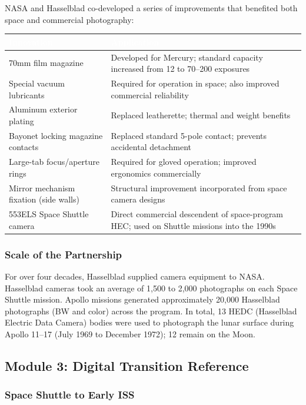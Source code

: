 \documentclass[11pt,letterpaper]{article}
\newcommand{\tableheader}[1]{\textbf{\sffamily\textcolor{white}{#1}}}
\begin{document}
NASA and Hasselblad co-developed a series of improvements that benefited both space and commercial photography:

\begin{center}
\begin{tabularx}{\textwidth}{L{5cm}X}
\toprule
{}
\tableheader{Innovation} & \tableheader{Application} \\
\midrule
70mm film magazine & Developed for Mercury; standard capacity increased from 12 to 70--200 exposures \\
Special vacuum lubricants & Required for operation in space; also improved commercial reliability \\
Aluminum exterior plating & Replaced leatherette; thermal and weight benefits \\
Bayonet locking magazine contacts & Replaced standard 5-pole contact; prevents accidental detachment \\
Large-tab focus/aperture rings & Required for gloved operation; improved ergonomics commercially \\
Mirror mechanism fixation (side walls) & Structural improvement incorporated from space camera designs \\
553ELS Space Shuttle camera & Direct commercial descendent of space-program HEC; used on Shuttle missions into the 1990s \\
\bottomrule
\end{tabularx}
\end{center}

\subsubsection{Scale of the Partnership}

For over four decades, Hasselblad supplied camera equipment to NASA. Hasselblad cameras took an average of 1,500 to 2,000 photographs on each Space Shuttle mission. Apollo missions generated approximately 20,000 Hasselblad photographs (BW and color) across the program. In total, 13 HEDC (Hasselblad Electric Data Camera) bodies were used to photograph the lunar surface during Apollo 11--17 (July 1969 to December 1972); 12 remain on the Moon.

\subsection{Module 3: Digital Transition Reference}

\subsubsection{Space Shuttle to Early ISS}
\end{document}
